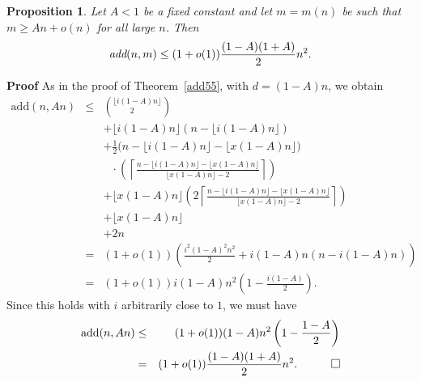\documentclass{article}
\newtheorem{Proposition}[Theorem]{Proposition}
\newtheorem{Proof of Theorem}{Proof of Theorem}
\begin{document}
\begin{Proposition} \label{add61}
Let $A<1$ be a fixed constant and let $m=m(n)$ be such that $m \geq An+o(n)$ for all large $n$.
Then 
\begin{displaymath}
\emph{add}(n,m) \leq (1+o(1)) \frac{(1-A)(1+A)}{2} n^{2}. 
\end{displaymath}
\end{Proposition}
\textbf{Proof}
As in the proof of Theorem~\ref{add55}, with $d=(1-A)n$, we obtain
\begin{eqnarray*}
\textrm{add}(n,An) 
& \leq & \left( ^{\lfloor i(1-A)n \rfloor}_{\phantom{www}2} \right) \\
& & + \lfloor i(1-A)n \rfloor (n - \lfloor i(1-A)n \rfloor) \\
& & +\frac{1}{2} \Big( n - \lfloor i(1-A)n \rfloor - \lfloor x(1-A)n \rfloor \Big) \\
& & \phantom{w} \cdot
\left( \left \lceil 
\frac{n - \lfloor i(1-A)n \rfloor - \lfloor x(1-A)n \rfloor}{ \lfloor x(1-A)n \rfloor - 2} 
\right \rceil \right) \\
& & + \lfloor x(1-A)n \rfloor 
\left( 2 \left \lceil 
\frac{n - \lfloor i(1-A)n \rfloor - \lfloor x(1-A)n \rfloor}{ \lfloor x(1-A)n \rfloor - 2} 
\right \rceil \right) \\
& & + \lfloor x(1-A)n \rfloor \\
& & + 2n \\
& = & (1+o(1)) \left( \frac{i^{2}(1-A)^{2}n^{2}}{2} + i(1-A)n(n-i(1-A)n) \right) \\
& = & (1+o(1)) i(1-A)n^{2} \left( 1- \frac{i(1-A)}{2} \right). 
\end{eqnarray*}
Since this holds with $i$ arbitrarily close to $1$,
we must have 
\begin{eqnarray*}
\textrm{add}(n,An) & \leq & (1+o(1)) (1-A)n^{2} \left( 1- \frac{1-A}{2} \right) \\
& = & (1+o(1)) \frac{(1-A)(1+A)}{2}n^{2}.
\phantom{qwerty} 
\setlength{\unitlength}{.25cm}
\begin{picture}(1,1)
\put(0,0){\line(1,0){1}}
\put(0,0){\line(0,1){1}}
\put(1,1){\line(-1,0){1}}
\put(1,1){\line(0,-1){1}}
\end{picture}
\end{eqnarray*} 
\phantom{p}
\end{document}

